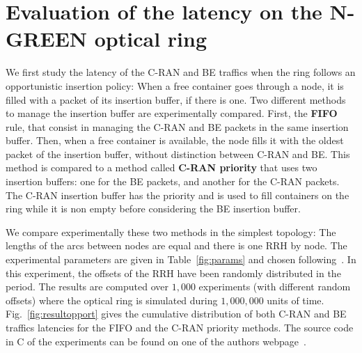 \documentclass[10pt, conference, letterpaper]{IEEEtran}
\begin{document}
   \section{Evaluation of the latency on the N-GREEN optical ring}
   \label{sec:oportmethods}
   
   
  We first study the latency of the C-RAN and BE traffics when the ring follows an opportunistic insertion policy: When a free container goes through a node, it is filled with a packet of its insertion buffer, if there is one.
 Two different methods to manage the insertion buffer are experimentally compared. First, the \textbf{FIFO} rule, that consist in managing the C-RAN and BE packets in the same insertion buffer. Then, when a free container is available, the node fills it with the oldest packet of the insertion buffer, without distinction between C-RAN and BE. This method is compared to a method called \textbf{C-RAN priority} that uses two insertion buffers: one for the BE packets, and another for the C-RAN packets. The C-RAN insertion buffer has the priority and is used to fill containers on the ring while it is non empty before considering the BE insertion buffer.  
 
We compare experimentally these two methods in the simplest topology: The lengths of the arcs between nodes are equal and there is one RRH by node. The experimental parameters are given in Table~\ref{fig:params} and chosen following~\cite{ngreenarchitecture}. In this experiment, the offsets of the RRH have been randomly distributed in the period. The results are computed over $1,000$ experiments (with different random offsets) where the optical ring is simulated during $1,000,000$ units of time. Fig.~\ref{fig:resultopport} gives the cumulative distribution of both C-RAN and BE traffics latencies for the FIFO and the C-RAN priority methods. The source code in C of the experiments can be found on one of the authors webpage~\cite{webpage}.
   \vspace{0.5cm}
  \hspace{-0.75cm}
\end{document}
